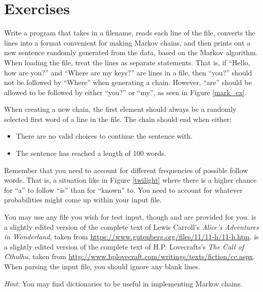 \documentclass[11pt]{cselabheader}
\begin{document}
\section{Exercises}
\label{sec:ex}


\begin{ex}[markov.py] Write a program that takes in a filename, reads each line of the file, converts the lines into a format convenient for making Markov chains, and then prints out a new sentence randomly generated from the data, based on the Markov algorithm. When loading the file, treat the lines as separate statements. That is, if ``Hello, how are you?'' and ``Where are my keys?'' are lines in a file, then ``you?'' should not be followed by ``Where'' when generating a chain. However, ``are'' should be allowed to be followed by either ``you?'' or ``my'', as seen in Figure \ref{mark_ex}.

  When creating a new chain, the first element should always be a randomly selected first word of a line in the file. The chain should end when either:
  \begin{itemize}
  \item There are no valid choices to continue the sentence with.
  \item The sentence has reached a length of 100 words.
  \end{itemize}

  Remember that you need to account for different frequencies of possible
  follow words. That is, a situation like in Figure \ref{twilight} where
  there is a higher chance for ``a'' to follow ``is'' than for ``known''
  to. You need to account for whatever probabilities might come up within
  your input file.

  You may use any file you wish for test input, though  and
   are provided for you.
   is a slightly edited version of the complete text of
  Lewis Carroll's \emph{Alice's Adventures in Wonderland}, taken from
  \url{https://www.gutenberg.org/files/11/11-h/11-h.htm}.
   is a slightly edited version of the complete text of
  H.P. Lovecrafts's \emph{The Call of Cthulhu}, taken from
  \url{http://www.hplovecraft.com/writings/texts/fiction/cc.aspx}.
  When parsing the input file, you should ignore any blank lines.

  \emph{Hint}: You may find dictionaries to be useful in implementing
  Markov chains.

\end{ex}
\end{document}
